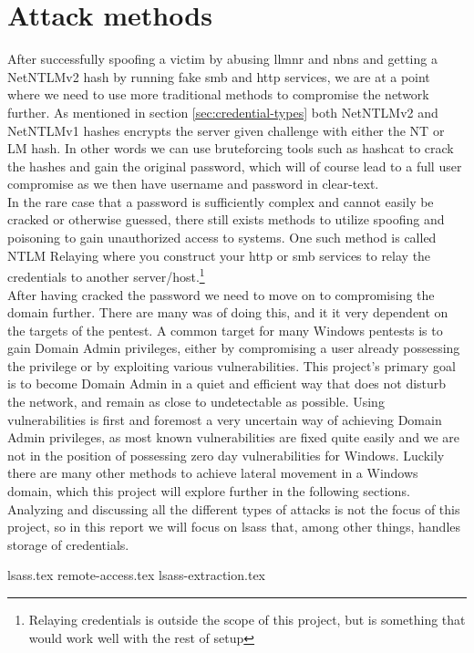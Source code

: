 \documentclass{article}
\begin{document}
\section{Attack methods}
\label{sec:attack-methods}
After successfully spoofing a victim by abusing \gls{llmnr} and \gls{nbns} and getting a NetNTLMv2 hash by running fake \gls{smb} and \gls{http} services, we are at a point where we need to use more traditional methods to compromise the network further. As mentioned in section \ref{sec:credential-types} both NetNTLMv2 and NetNTLMv1 hashes encrypts the server given challenge with either the NT or LM hash. In other words we can use bruteforcing tools such as hashcat\cite{url:hashes:hashcat-example-hashes} to crack the hashes and gain the original password, which will of course lead to a full user compromise as we then have username and password in clear-text.
\\
In the rare case that a password is sufficiently complex and cannot easily be cracked or otherwise guessed, there still exists methods to utilize spoofing and poisoning to gain unauthorized access to systems. One such method is called NTLM Relaying\cite{url:ntlm-relaying} where you construct your \gls{http} or \gls{smb} services to relay the credentials to another server/host.\footnote{Relaying credentials is outside the scope of this project, but is something that would work well with the rest of setup}
\\
After having cracked the password we need to move on to compromising the domain further. There are many was of doing this, and it it very dependent on the targets of the pentest. A common target for many Windows pentests is to gain Domain Admin privileges, either by compromising a user already possessing the privilege or by exploiting various vulnerabilities. This project's primary goal is to become Domain Admin in a quiet and efficient way that does not disturb the network, and remain as close to undetectable as possible. Using vulnerabilities is first and foremost a very uncertain way of achieving Domain Admin privileges, as most known vulnerabilities are fixed quite easily and we are not in the position of possessing zero day vulnerabilities for Windows. Luckily there are many other methods to achieve lateral movement in a Windows domain, which this project will explore further in the following sections. Analyzing and discussing all the different types of attacks is not the focus of this project, so in this report we will focus on \gls{lsass} that, among other things, handles storage of credentials.

{lsass.tex}
{remote-access.tex}
{lsass-extraction.tex}
\end{document}
